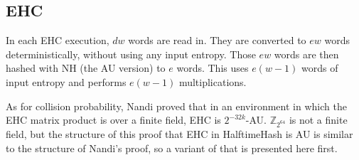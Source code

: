 \documentclass[sigconf, nonacm]{acmart}
\newcommand{\ints}{\mathbb{Z}}
\begin{document}
\subsection{EHC}

In each EHC execution, $d w$ words are read in.
They are converted to $e w$ words deterministically, without using any input entropy.
Those $e w$ words are then hashed with NH (the AU version) to $e$ words.
This uses $e(w - 1)$ words of input entropy and performs $e(w - 1)$ multiplications.






As for collision probability, Nandi proved that in an environment in which the EHC matrix product is over a finite field, EHC is $2^{-32k}$-AU.
$\ints_{2^{64}}$ is not a finite field, but the structure of this proof that EHC in HalftimeHash is AU is similar to the structure of Nandi's proof, so a variant of that is presented here first.  \cite{ehc-nandi}
\end{document}
